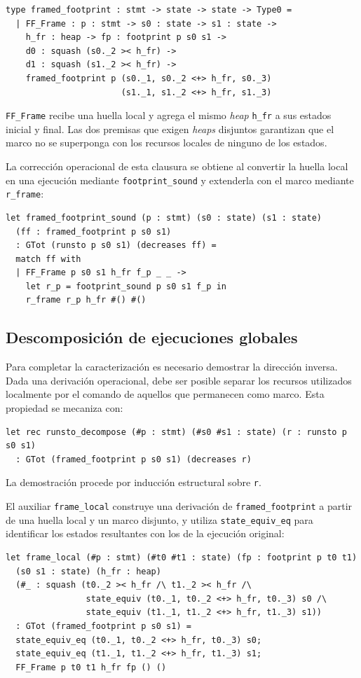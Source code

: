 \documentclass[a4paper,	11pt]{report}
\begin{document}
\begin{lstlisting}
type framed_footprint : stmt -> state -> state -> Type0 =
  | FF_Frame : p : stmt -> s0 : state -> s1 : state ->
    h_fr : heap -> fp : footprint p s0 s1 ->
    d0 : squash (s0._2 >< h_fr) ->
    d1 : squash (s1._2 >< h_fr) ->
    framed_footprint p (s0._1, s0._2 <+> h_fr, s0._3)
                       (s1._1, s1._2 <+> h_fr, s1._3)
\end{lstlisting}
\lstinline|FF_Frame| recibe una huella local y agrega el mismo \emph{heap} \lstinline|h_fr| a sus estados inicial y final.
Las dos premisas que exigen \emph{heaps} disjuntos garantizan que el marco no se superponga con los recursos locales de ninguno de los estados.

La corrección operacional de esta clausura se obtiene al convertir la huella local en una ejecución mediante
\lstinline|footprint_sound| y extenderla con el marco mediante \lstinline|r_frame|:

\begin{lstlisting}
let framed_footprint_sound (p : stmt) (s0 : state) (s1 : state) 
  (ff : framed_footprint p s0 s1)
  : GTot (runsto p s0 s1) (decreases ff) =
  match ff with
  | FF_Frame p s0 s1 h_fr f_p _ _ ->
    let r_p = footprint_sound p s0 s1 f_p in
    r_frame r_p h_fr #() #()
\end{lstlisting}

\subsection*{Descomposición de ejecuciones globales}
Para completar la caracterización es necesario demostrar la dirección inversa.
Dada una derivación operacional,
debe ser posible separar los recursos utilizados localmente por el comando de aquellos que permanecen como marco.
Esta propiedad se mecaniza con:

\begin{lstlisting}
let rec runsto_decompose (#p : stmt) (#s0 #s1 : state) (r : runsto p s0 s1)
  : GTot (framed_footprint p s0 s1) (decreases r)
\end{lstlisting}
La demostración procede por inducción estructural sobre \lstinline|r|.

El auxiliar \lstinline|frame_local| construye una derivación de \lstinline|framed_footprint| a partir de una huella local y un marco disjunto,
y utiliza \lstinline|state_equiv_eq| para identificar los estados resultantes con los de la ejecución original:

\begin{lstlisting}
let frame_local (#p : stmt) (#t0 #t1 : state) (fp : footprint p t0 t1)
  (s0 s1 : state) (h_fr : heap)
  (#_ : squash (t0._2 >< h_fr /\ t1._2 >< h_fr /\
                state_equiv (t0._1, t0._2 <+> h_fr, t0._3) s0 /\
                state_equiv (t1._1, t1._2 <+> h_fr, t1._3) s1))
  : GTot (framed_footprint p s0 s1) =
  state_equiv_eq (t0._1, t0._2 <+> h_fr, t0._3) s0;
  state_equiv_eq (t1._1, t1._2 <+> h_fr, t1._3) s1;
  FF_Frame p t0 t1 h_fr fp () ()
\end{lstlisting}
\end{document}
